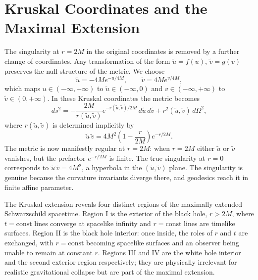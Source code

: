 \section{Kruskal Coordinates and the Maximal Extension}

The singularity at $r=2M$ in the original coordinates is removed by
a further change of coordinates. Any transformation of the form
$\tilde u = f(u)$, $\tilde v = g(v)$ preserves the null structure of
the metric. We choose
\begin{equation}
	\tilde u = -4M e^{-u/4M}, \qquad
	\tilde v = 4M e^{v/4M},
\end{equation}
which maps $u\in(-\infty,+\infty)$ to $\tilde u\in(-\infty,0)$ and
$v\in(-\infty,+\infty)$ to $\tilde v\in(0,+\infty)$. In these Kruskal
coordinates the metric becomes
\begin{equation}
	ds^2 = -\frac{2M}{r(\tilde u,\tilde v)}
	e^{-r(\tilde u,\tilde v)/2M}\,d\tilde u\,d\tilde v
	+ r^2(\tilde u,\tilde v)\,d\Omega^2,
\end{equation}
where $r(\tilde u,\tilde v)$ is determined implicitly by
\begin{equation}
	\tilde u\,\tilde v = 4M^2\!\left(1-\frac{r}{2M}\right)
	e^{-r/2M}.
\end{equation}
The metric is now manifestly regular at $r=2M$: when $r=2M$ either
$\tilde u$ or $\tilde v$ vanishes, but the prefactor
$e^{-r/2M}$ is finite. The true singularity at $r=0$ corresponds to
$\tilde u\,\tilde v = 4M^2$, a hyperbola in the $(\tilde u,\tilde v)$
plane. The singularity is genuine because the curvature invariants
diverge there, and geodesics reach it in finite affine parameter.


The Kruskal extension reveals four distinct regions of the maximally
extended Schwarzschild spacetime. Region I is the exterior of the black
hole, $r > 2M$, where $t = \text{const}$ lines converge at spacelike
infinity and $r = \text{const}$ lines are timelike surfaces. Region II
is the black hole interior: once inside, the roles of $r$ and $t$ are
exchanged, with $r = \text{const}$ becoming spacelike surfaces and an
observer being unable to remain at constant $r$. Regions III and IV are
the white hole interior and the second exterior region respectively;
they are physically irrelevant for realistic gravitational collapse but
are part of the maximal extension.

